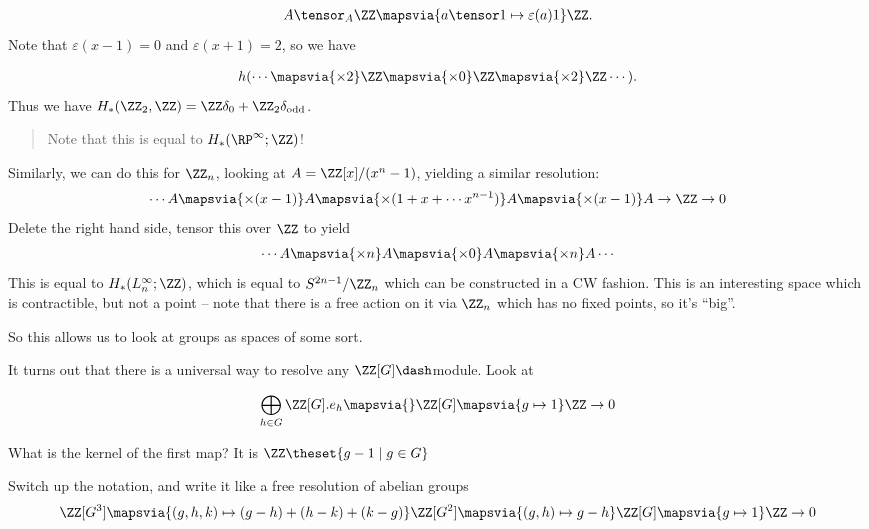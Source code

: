 \begin{example}
\begin{align*}
A\tensor_A \ZZ \mapsvia{a\tensor 1 \mapsto \varepsilon(a)1} \ZZ
.\end{align*} Note that \(\varepsilon(x-1) =0\) and
\(\varepsilon(x+1) = 2\), so we have

\begin{align*}
h(\cdots \mapsvia{\times 2} \ZZ \mapsvia{\times 0} \ZZ \mapsvia{\times 2} \ZZ \cdots)
.\end{align*} Thus we have
\(H_*(\ZZ_2, \ZZ) = \ZZ \delta_0 + \ZZ_2 \delta_{\text{odd}}\).

\begin{quote}
Note that this is equal to \(H_*(\RP^\infty; \ZZ)\)!
\end{quote}

\end{example}

\begin{example}

Similarly, we can do this for \(\ZZ_n\), looking at
\(A = \ZZ[x] / (x^n - 1)\), yielding a similar resolution:
\begin{align*}
\cdots A \mapsvia{\times(x-1)} A \mapsvia{\times(1+x+\cdots x^{n-1})} A \mapsvia{\times (x-1)}A \to \ZZ \to 0
\end{align*} Delete the right hand side, tensor this over \(\ZZ\) to
yield
\begin{align*}
\cdots A \mapsvia{\times n} A \mapsvia{\times 0} A \mapsvia{\times n} A \cdots
\end{align*} This is equal to \(H_*(L^\infty_n; \ZZ)\), which is equal
to \(S^{2n-1} / \ZZ_n\) which can be constructed in a CW fashion. This
is an interesting space which is contractible, but not a point -- note
that there is a free action on it via \(\ZZ_n\) which has no fixed
points, so it's ``big''.

\end{example}

So this allows us to look at groups as spaces of some sort.

It turns out that there is a universal way to resolve any
\(\ZZ[G]\dash\)module. Look at

\begin{align*}
\bigoplus_{h\in G} \ZZ[G].e_h \mapsvia{} \ZZ[G] \mapsvia{g\mapsto 1} \ZZ \to 0
\end{align*}

What is the kernel of the first map? It is
\(\ZZ\theset{g-1\mid g\in G}\)

Switch up the notation, and write it like a free resolution of abelian
groups
\begin{align*}
\ZZ[G^3] \mapsvia{(g,h,k) \mapsto (g-h) + (h-k) + (k-g)} \ZZ[G^2] \mapsvia{(g,h) \mapsto g-h} \ZZ[G] \mapsvia{g\mapsto 1} \ZZ \to 0
\end{align*}

